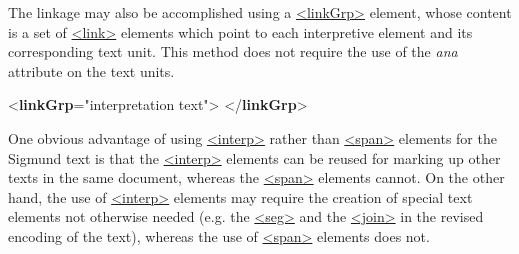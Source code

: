 The linkage may also be accomplished using a \hyperref[TEI.linkGrp]{<linkGrp>} element, whose content is a set of \hyperref[TEI.link]{<link>} elements which point to each interpretive element and its corresponding text unit. This method does not require the use of the {\itshape ana} attribute on the text units. \par\bgroup{}\exampleFont \begin{shaded}\noindent\mbox{}{<\textbf{linkGrp}\hspace*{1em}{targFunc}="{interpretation text}">}\mbox{}\newline 
{}\mbox{}\newline 
{}\mbox{}\newline 
{}\mbox{}\newline 
{}\mbox{}\newline 
{}\mbox{}\newline 
{}\mbox{}\newline 
{</\textbf{linkGrp}>}\end{shaded}\egroup\par \par
One obvious advantage of using \hyperref[TEI.interp]{<interp>} rather than \hyperref[TEI.span]{<span>} elements for the Sigmund text is that the \hyperref[TEI.interp]{<interp>} elements can be reused for marking up other texts in the same document, whereas the \hyperref[TEI.span]{<span>} elements cannot. On the other hand, the use of \hyperref[TEI.interp]{<interp>} elements may require the creation of special text elements not otherwise needed (e.g. the \hyperref[TEI.seg]{<seg>} and the \hyperref[TEI.join]{<join>} in the revised encoding of the text), whereas the use of \hyperref[TEI.span]{<span>} elements does not.
